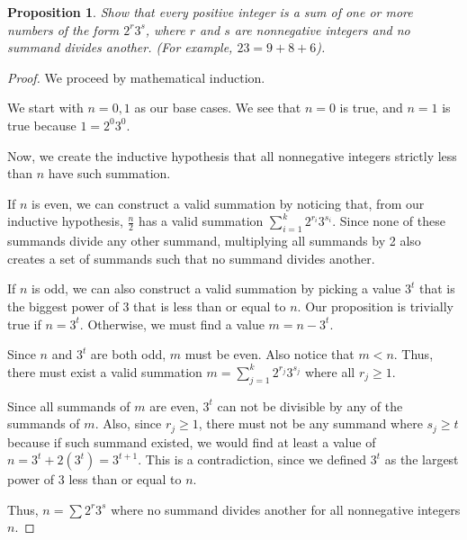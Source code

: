 \documentclass{article}
\newtheorem{proposition}{Proposition}
\theoremstyle{definition}
\begin{document}
\begin{proposition}
        Show that every positive integer is a sum of one or more numbers of the 
        form \(2^r3^s\), where \(r\) and \(s\) are nonnegative integers and no 
        summand divides another. (For example, \(23 = 9 + 8 + 6\)).
\end{proposition}
\begin{proof}
    We proceed by mathematical induction. 

    We start with \(n = 0, 1\) as our base cases. We see that \(n = 0\) is true, 
    and \(n = 1\) is true because \(1 = 2^0 3^0\).
    
    Now, we create the inductive hypothesis that all nonnegative 
    integers strictly less than \(n\) have such summation.

    If \(n\) is even, we can construct a valid summation by noticing 
    that, from our inductive hypothesis, \(\frac{n}{2}\) has a valid summation 
    \(\sum_{i=1}^{k}2^{r_i}3^{s_i}\). Since none of these summands divide 
    any other summand, multiplying all summands by 2 also creates a set 
    of summands such that no summand divides another.

    If \(n\) is odd, we can also construct a valid summation by picking 
    a value \(3^t\) that is the biggest power of 3 that is less than or 
    equal to \(n\). Our proposition is trivially true if \(n = 3^t\). 
    Otherwise, we must find a value \(m = n - 3^t\).

    Since \(n\) and \(3^t\) are both odd, \(m\) must be even. Also notice 
    that \(m < n\). Thus, there must exist a valid summation
    \(m = \sum_{j=1}^{k}2^{r_j}3^{s_j}\) where all \(r_j \ge 1\).

    Since all summands of \(m\) are even, \(3^t\) can not be divisible 
    by any of the summands of \(m\). Also, since \(r_j \ge 1\), there 
    must not be any summand where \(s_j \ge t\) because if such summand 
    existed, we would find at least a value of 
    \(n = 3^t + 2(3^t) = 3^{t+1}\). This is a contradiction, since we 
    defined \(3^t\) as the largest power of 3 less than or equal to \(n\).

    Thus, \(n = \sum 2^r3^s\) where no summand divides another for all 
    nonnegative integers \(n\).
\end{proof}
\end{document}
